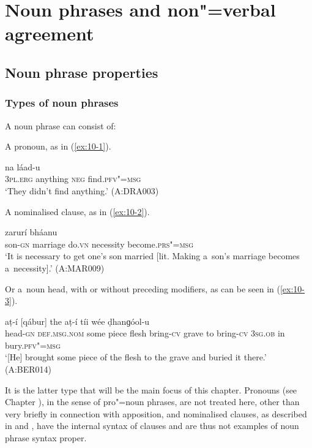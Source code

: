 \chapter{Noun phrases and non"=verbal agreement}
\label{chap:10}


\section{Noun phrase properties}
\label{sec:10-1}

\subsection{Types of noun phrases}
\label{subsec:10-1-1}


A noun phrase can consist of: 


A pronoun, as in (\ref{ex:10-1}).

\begin{exe}
\ex
\label{ex:10-1}
\gll [taním] [ɡa] na láad-u  \\
\textsc{3pl.erg} anything \textsc{neg} find.\textsc{pfv"=msg} \\
\glt `They didn't find anything.' (A:DRA003)
\end{exe}

A nominalised clause, as in (\ref{ex:10-2}).

\begin{exe}
\ex
\label{ex:10-2}
 zarurí bháanu \\
son-\textsc{gn} marriage do.\textsc{vn} necessity become.\textsc{prs"=msg}  \\
\glt `It is necessary to get one's son married [lit. Making a~son's marriage becomes a~necessity].' (A:MAR009)
\end{exe}

Or a~noun head, with or without preceding modifiers, as can be seen in (\ref{ex:10-3}).

\begin{exe}
\ex
\label{ex:10-3}
 aṭ-í [qábur] the aṭ-í tíi wée ḍhanɡóol-u \\
head-\textsc{gn} \textsc{def.msg.nom} some piece flesh bring-\textsc{cv} grave  to bring-\textsc{cv} \textsc{3sg.ob} in bury.\textsc{pfv"=msg}  \\
\glt `[He] brought some piece of the flesh to the grave and buried it there.' (A:BER014)
\end{exe}

It is the latter type that will be the main focus of this chapter. Pronouns (see Chapter ), in the sense of pro"=noun phrases, are not treated here, other than very briefly in connection with apposition, and nominalised clauses, as described in  and , have the internal syntax of clauses and are thus not examples of noun phrase syntax proper. 


